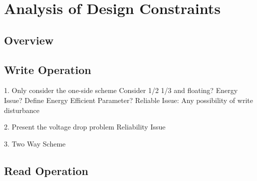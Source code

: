 \vspace{10pt}
\section{Analysis of Design Constraints}\label{sec:wr}
\subsection{Overview}
\subsection{Write Operation}
1. Only consider the one-side scheme
Consider 1/2 1/3 and floating?
Energy Issue? Define Energy Efficient Parameter?
Reliable Issue: Any possibility of write disturbance 




2. Present the voltage drop problem
Reliability Issue

3. Two Way Scheme

\subsection{Read Operation} 